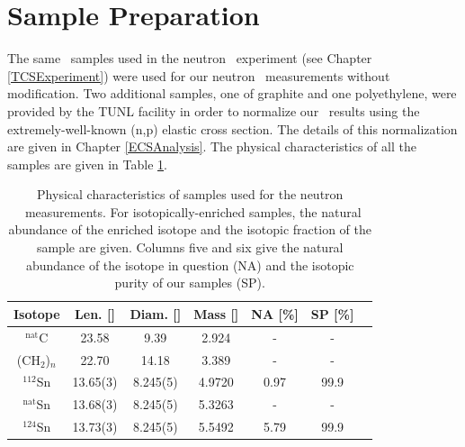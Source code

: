 \section{Sample Preparation}
The same \snTwelveNatFour\ samples used in the neutron \tot\ experiment (see Chapter
\ref{TCSExperiment}) were used for our neutron
\el\ measurements without modification. Two additional samples, one of graphite and one
polyethylene, were provided by the TUNL facility in order to normalize our \el\
results using the extremely-well-known (n,p) elastic cross section. The
details of this normalization are given in Chapter \ref{ECSAnalysis}.
The physical characteristics of all the samples are given in Table \ref{ECSSampleTable}.
\\
\begin{table}[ht]
    \centering
    \begin{tabular}{c c c c c c c}
        \toprule
        Isotope & Len. [\milli\meter] & Diam. [\milli\meter]
        & Mass [\gram] & NA [\%] & SP [\%] \\
        \midrule
        $^{\text{nat}}$C & 23.58 & 9.39 & 2.924 & - & -\\
        (CH$_{2}$)$_{n}$ & 22.70 & 14.18 & 3.389 & - & -\\

        $^{112}$Sn & 13.65(3) & 8.245(5) &
        4.9720 & 0.97 & 99.9\\
        $^{\text{nat}}$Sn & 13.68(3) & 8.245(5) &
        5.3263 & - & -\\
        $^{124}$Sn & 13.73(3) & 8.245(5) &
        5.5492 & 5.79 & 99.9\\
        \bottomrule
    \end{tabular}
    \caption[Physical characteristics of samples used for neutron \el\
    measurements]
    {
        Physical characteristics of samples used for the neutron \el\
        measurements. For isotopically-enriched samples, the natural abundance
        of the enriched isotope and the isotopic fraction of the sample are
        given. Columns five and six give the natural abundance of the isotope in question (NA) and 
        the isotopic purity of our samples (SP).
    }
    \label{ECSSampleTable}
\end{table}

